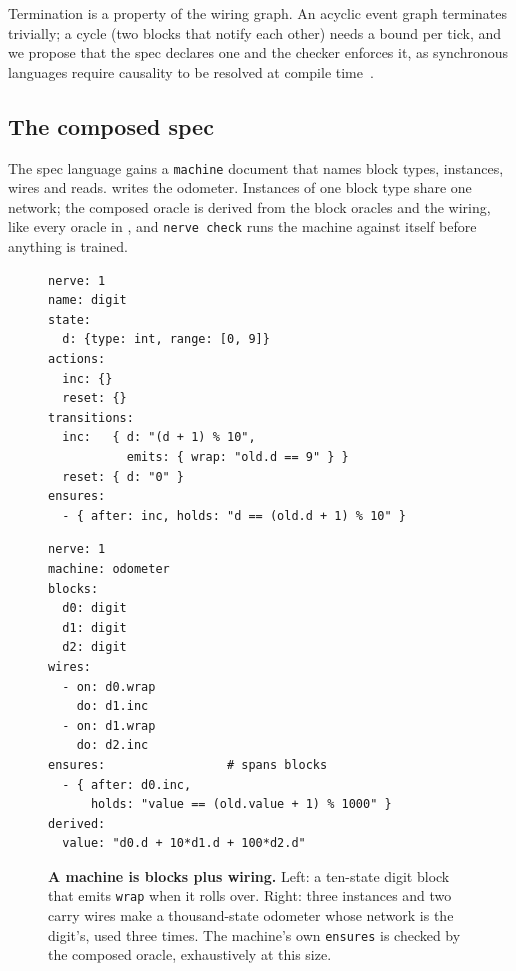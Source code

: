 \begin{remark}
Termination is a property of the wiring graph. An acyclic event graph terminates trivially; a cycle (two
blocks that notify each other) needs a bound per tick, and we propose that the spec declares one and the
checker enforces it, as synchronous languages require causality to be resolved at compile time~\citep{berry1992esterel,benveniste2003synchronous}.
\end{remark}

\subsection{The composed spec}
\label{sec:composed}

The spec language gains a \texttt{machine} document that names block types, instances, wires and reads.
 writes the odometer. Instances of one block type share one network; the composed
oracle is derived from the block oracles and the wiring, like every oracle in \method, and \texttt{nerve check}
runs the machine against itself before anything is trained.

\begin{figure}[t]
\begin{minipage}[t]{0.47\textwidth}
\begin{lstlisting}
nerve: 1
name: digit
state:
  d: {type: int, range: [0, 9]}
actions:
  inc: {}
  reset: {}
transitions:
  inc:   { d: "(d + 1) % 10",
           emits: { wrap: "old.d == 9" } }
  reset: { d: "0" }
ensures:
  - { after: inc, holds: "d == (old.d + 1) % 10" }
\end{lstlisting}
\end{minipage}\hfill
\begin{minipage}[t]{0.47\textwidth}
\begin{lstlisting}
nerve: 1
machine: odometer
blocks:
  d0: digit
  d1: digit
  d2: digit
wires:
  - on: d0.wrap
    do: d1.inc
  - on: d1.wrap
    do: d2.inc
ensures:                 # spans blocks
  - { after: d0.inc,
      holds: "value == (old.value + 1) % 1000" }
derived:
  value: "d0.d + 10*d1.d + 100*d2.d"
\end{lstlisting}
\end{minipage}
\caption{\textbf{A machine is blocks plus wiring.} Left: a ten-state digit block that emits \texttt{wrap} when
it rolls over. Right: three instances and two carry wires make a thousand-state odometer whose network is the
digit's, used three times. The machine's own \texttt{ensures} is checked by the composed oracle, exhaustively
at this size.}
\label{fig:odometer-spec}
\end{figure}
